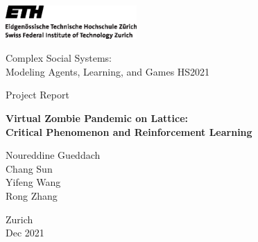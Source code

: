 
\thispagestyle{empty}

\begin{center}
\includegraphics[width=5cm]{ETHlogo.eps}

\bigskip


\bigskip


\bigskip


\LARGE{Complex Social Systems:\\ }
\LARGE{Modeling Agents, Learning, and Games HS2021\\}

\bigskip

\bigskip

\small{Project Report}\\

\bigskip

\bigskip

\bigskip

\bigskip


\LARGE{\textbf{Virtual Zombie Pandemic on Lattice:}}\\
\LARGE{\textbf{Critical Phenomenon and Reinforcement Learning}}\\

\bigskip

\bigskip

\bigskip

\LARGE{Noureddine Gueddach\\
       Chang Sun\\
       Yifeng Wang\\
       Rong Zhang
       }



\bigskip

\bigskip

\bigskip

\bigskip

\bigskip

\bigskip

\bigskip

\bigskip

Zurich\\
Dec 2021\\

\end{center}


